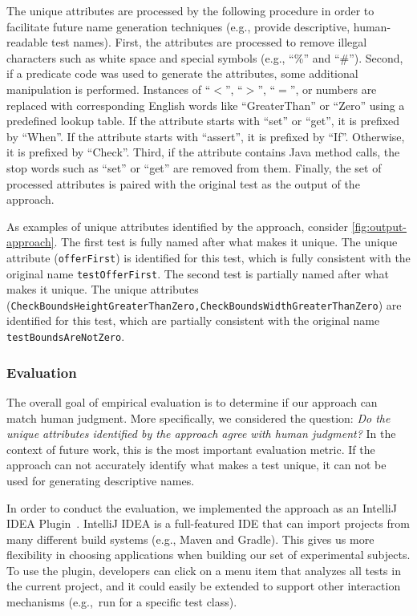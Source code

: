 The unique attributes are processed by the following procedure in order to facilitate future name generation techniques (e.g., provide descriptive, human-readable test names).
%
First, the attributes are processed to remove illegal characters such as white space and special symbols (e.g., \enquote{\%} and \enquote{\#}).
%
Second, if a predicate code was used to generate the attributes, some additional manipulation is performed.
%
Instances of \enquote{$<$}, \enquote{$>$}, \enquote{$=$}, or numbers are replaced with corresponding English words like \enquote{GreaterThan} or \enquote{Zero} using a predefined lookup table.
%
If the attribute starts with \enquote{set} or \enquote{get}, it is prefixed by \enquote{When}.
%
If the attribute starts with \enquote{assert}, it is prefixed by \enquote{If}.
%
Otherwise, it is prefixed by \enquote{Check}.
%
Third, if the attribute contains Java method calls, the stop words such as \enquote{set} or \enquote{get} are removed from them.
%
Finally, the set of processed attributes is paired with the original test as the output of the approach.


As examples of unique attributes identified by the approach, consider \cref{fig:output-approach}.
%
The first test is fully named after what makes it unique.
%
The unique attribute (\texttt{offer\-First}) is identified for this test, which is fully consistent with the original name \texttt{test\-Offer\-First}.
%
The second test is partially named after what makes it unique.
%
The unique attributes (\texttt{Check\-Bounds\-Height\-Greater\-Than\-Zero,Check\-Bounds\-Width\-Greater\-Than\-Zero}) are identified for this test, which are partially consistent with the original name \texttt{test\-Bounds\-Are\-Not\-Zero}.


\subsubsection{Evaluation}
\label{sec:emp-eval-attributes}

The overall goal of empirical evaluation is to determine if our approach can match human judgment.
%
More specifically, we considered the question: \emph{Do the unique attributes identified by the approach agree with human judgment?}
%
In the context of future work, this is the most important evaluation metric.
%
If the approach can not accurately identify what makes a test unique, it can not be used for generating descriptive names.


In order to conduct the evaluation, we implemented the approach as an IntelliJ IDEA Plugin~\cite{IntelliJPlugin}.
%
IntelliJ IDEA is a full-featured IDE that can import projects from many different build systems (e.g., Maven and Gradle).
%
This gives us more flexibility in choosing applications when building our set of experimental subjects.
%
To use the plugin, developers can click on a menu item that analyzes all tests in the current project, and it could easily be extended to support other interaction mechanisms (e.g.,~run for a specific test class).

